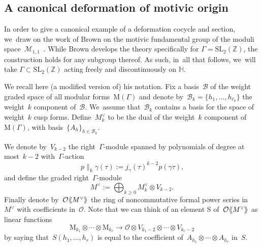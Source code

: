 \documentclass[JEP,XML,SOM,Unicode,published]{cedram}
\theoremstyle{plain}
\theoremstyle{definition}
\newcommand{\tx}{\text}
\newcommand{\nbd}{\nobreakdash-\hspace{0pt}}
\newcommand{\bbZ}{\ensuremath{\mathbb{Z}}}
\newcommand{\cB}{\ensuremath{\mathcal{B}}}
\newcommand{\cM}{\ensuremath{\mathcal{M}}}
\newcommand{\cO}{\ensuremath{\mathcal{O}}}
\newcommand{\rmM}{\ensuremath{\mathrm{M}}}
\newcommand{\defeq}{:=}
\newcommand{\SL}[1]{\ensuremath{\mathrm{SL}_{#1}}}
\newcommand{\HS}{\ensuremath{\mathbb{H}}}
\let\Ga\Gamma
\let\ga\gamma
\newcommand{\llangle}{\mathopen{\langle\mspace{-4mu}\langle}}
\newcommand{\rrangle}{\mathclose{\rangle\mspace{-4mu}\rangle}}
\begin{document}
\subsection{A canonical deformation of motivic origin}
\label{ssec:canonical_deformation}

In order to give a canonical example of a deformation cocycle and section, we~draw on the work of Brown on the motivic fundamental group of the moduli space~$\cM_{1,1}$~\cite{brown17}. While Brown develops the theory specifically for $\Ga=\SL2(\bbZ)$, the construction holds for any subgroup thereof. As such, in~all that follows, we~will take $\Ga\subset \SL2(\bbZ)$ acting freely and discontinuously on $\HS$.

We recall here (a modified version of) his notation. Fix a basis~$\cB$ of the weight graded space of all modular forms~$\rmM(\Ga)$ and denote by~$\cB_k=\{h_1,\ldots,h_{\ell_k}\}$ the weight~$k$ component of~$\cB$. We~assume that~$\cB_k$ contains a basis for the space of weight~$k$ cusp forms. Define~$M^\vee_k$ to be the dual of the weight~$k$ component of~$\rmM(\Ga)$, with basis~$\{A_h\}_{h\in\cB_k}$.

We denote by~$V_{k-2}$ the right~$\Ga$\nbd{}module spanned by polynomials of degree at most~$k-2$ with~$\Ga$\nbd{}action
\begin{equation*}
p \big\|_k\ga (\tau) \defeq j_\ga(\tau)^{k-2}p(\ga\tau)
\tx{,}
\end{equation*}
and define the graded right~$\Ga$\nbd{}module
\begin{equation*}
M^\vee \defeq \bigoplus_{k\geq 0 }M^\vee_k \otimes V_{k-2}
\tx{.}
\end{equation*}
Finally denote by~$\cO\llangle M^{\vee}\rrangle$ the ring of noncommutative formal power series in~$M^\vee$ with coefficients in~$\cO$. Note that we can think of an element S of~$\cO\llangle M^{\vee}\rrangle$ as linear functions
\begin{equation*}
\rmM_{k_1}\otimes \cdots \otimes \rmM_{k_r}
\to
\cO\otimes V_{k_1-2}\otimes\cdots \otimes V_{k_r-2}
\end{equation*}
by saying that~$S(h_1,\ldots,h_r)$ is equal to the coefficient of~$A_{h_1}\otimes\cdots \otimes A_{h_r}$ in~$S$.
\end{document}
